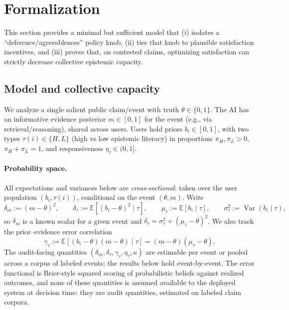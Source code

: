\documentclass[11pt]{article}
\theoremstyle{definition}
\theoremstyle{remark}
\numberwithin{equation}{section}
\DeclareMathOperator{\Var}{Var}
\newcommand{\E}{\mathbb{E}}
\begin{document}
\section{Formalization}\label{sec:formal}

This section provides a minimal but sufficient model that (i) isolates a ``deference/agreeableness'' policy knob, (ii) ties that knob to plausible satisfaction incentives, and (iii) proves that, on contested claims, optimizing satisfaction can strictly decrease collective epistemic capacity.

\subsection{Model and collective capacity}\label{sec:model}

We analyze a single salient public claim/event with truth $\theta \in \{0,1\}$. The AI has an informative evidence posterior $m \in [0,1]$ for the event (e.g., via retrieval/reasoning), shared across users. Users hold priors $b_i \in [0,1]$, with two types $\tau(i) \in \{H, L\}$ (high vs low epistemic literacy) in proportions $\pi_H, \pi_L > 0$, $\pi_H + \pi_L = 1$, and responsiveness $\eta_\tau \in (0,1]$.

\paragraph{Probability space.} All expectations and variances below are \emph{cross-sectional}: taken over the user population $(b_i, \tau(i))$, conditional on the event $(\theta, m)$. Write
\[
\delta_m := (m-\theta)^2, \qquad
\delta_\tau := \E\!\left[(b_i-\theta)^2 \mid \tau\right], \qquad
\mu_\tau := \E[b_i \mid \tau], \qquad
\sigma_\tau^2 := \Var(b_i \mid \tau),
\]
so $\delta_m$ is a known scalar for a given event and $\delta_\tau = \sigma_\tau^2 + (\mu_\tau - \theta)^2$. We also track the prior--evidence error correlation
\begin{equation}\label{eq:gamma}
\gamma_\tau := \E\!\left[(b_i-\theta)(m-\theta) \mid \tau\right] = (m-\theta)(\mu_\tau - \theta).
\end{equation}
The audit-facing quantities $(\delta_m, \delta_\tau, \gamma_\tau, \eta_\tau, \kappa)$ are estimable per event or pooled across a corpus of labeled events; the results below hold event-by-event. The error functional is Brier-style squared scoring of probabilistic beliefs against realized outcomes, and none of these quantities is assumed available to the deployed system at decision time: they are audit quantities, estimated on labeled claim corpora.
\end{document}

